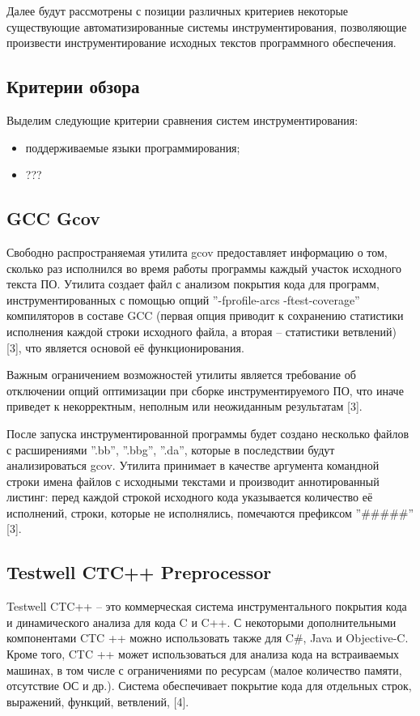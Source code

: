 Далее будут рассмотрены с позиции различных критериев некоторые существующие автоматизированные системы инструментирования, позволяющие произвести инструментирование исходных текстов программного обеспечения.

\subsection{Критерии обзора}

Выделим следующие критерии сравнения систем инструментирования:
\begin{itemize}
  \item поддерживаемые языки программирования;
  \item ???
\end{itemize}

\subsection{GCC Gcov}
Свободно распространяемая утилита gcov предоставляет информацию о том, сколько раз исполнился во время работы программы каждый участок исходного текста ПО. Утилита создает файл с анализом покрытия кода для программ, инструментированных с помощью опций ''-fprofile-arcs -ftest-coverage'' компиляторов в составе GCC (первая опция приводит к сохранению статистики исполнения каждой строки исходного файла, а вторая -- статистики ветвлений) [3], что является основой её функционирования.

Важным ограничением возможностей утилиты является требование об отключении опций оптимизации при сборке инструментируемого ПО, что иначе приведет к некорректным, неполным или неожиданным результатам [3].

После запуска инструментированной программы будет создано несколько файлов с расширениями ''.bb'', ''.bbg'', ''.da'', которые в последствии будут анализироваться gcov. Утилита принимает в качестве аргумента командной строки имена файлов с исходными текстами и производит аннотированный листинг: перед каждой строкой исходного кода указывается количество её исполнений, строки, которые не исполнялись, помечаются префиксом ''\#\#\#\#\#'' [3].

\subsection{Testwell CTC++ Preprocessor}
Testwell CTC++ -- это коммерческая система инструментального покрытия кода и динамического анализа для кода C и C++. С некоторыми дополнительными компонентами CTC ++ можно использовать также для C\#, Java и Objective-C. Кроме того, CTC ++ может использоваться для анализа кода на встраиваемых машинах, в том числе с ограничениями по ресурсам (малое количество памяти, отсутствие ОС и др.). Система обеспечивает покрытие кода для отдельных строк, выражений, функций, ветвлений, [4].

